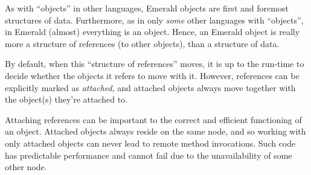 As with ``objects'' in other languages, Emerald objects are first and
foremost structures of data.  Furthermore, as in only \emph{some}
other languages with ``objects'', in Emerald (almost) everything is an
object. Hence, an Emerald object is really more a structure of
references (to other objects), than a structure of data.

By default, when this ``structure of references'' moves, it is up to
the run-time to decide whether the objects it refers to move with it.
However, references can be explicitly marked as \emph{attached}, and
attached objects always move together with the object(s) they're
attached to.

Attaching references can be important to the correct and efficient
functioning of an object. Attached objects always reside on the same
node, and so working with only attached objects can never lead to
remote method invocations. Such code has predictable performance and
cannot fail due to the unavailability of some other node.


